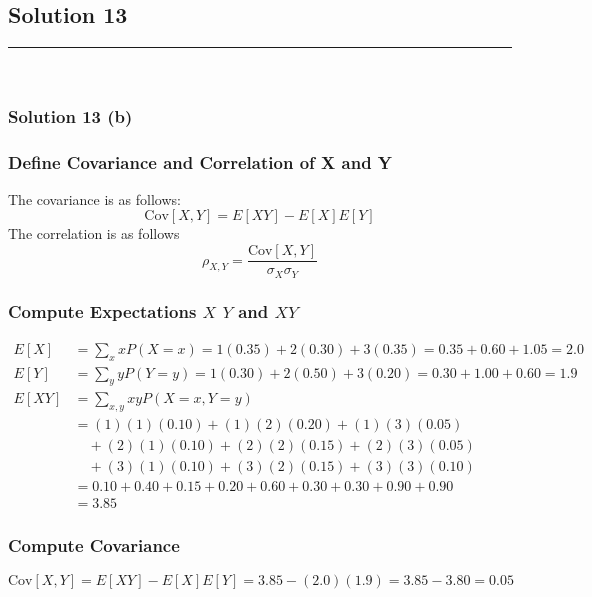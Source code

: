 \documentclass{article}
\begin{document}
\subsection*{Solution 13}
\noindent\rule{\textwidth}{0.4pt}\\
\subsubsection*{Solution  13 (b)}

\subsubsection*{Define Covariance and Correlation of X and Y}
\parbox{\textwidth}{
The covariance is as follows:
$$\text{Cov}[X, Y] = E[XY] - E[X]E[Y]$$
The correlation is as follows
$$\rho_{X, Y} = \frac{\text{Cov}[X, Y]}{\sigma_X \sigma_Y}$$
}

\subsubsection*{Compute Expectations $X$ $Y$ and $XY$}

\begin{align*}
  E[X] &= \sum_{x} x P(X=x) = 1(0.35) + 2(0.30) + 3(0.35) = 0.35 + 0.60 + 1.05 = 2.0 \\
  E[Y] &= \sum_{y} y P(Y=y) = 1(0.30) + 2(0.50) + 3(0.20) = 0.30 + 1.00 + 0.60 = 1.9 \\
    E[XY] &= \sum_{x,y} xy P(X=x, Y=y) \\
          &= (1)(1)(0.10) + (1)(2)(0.20) + (1)(3)(0.05) \\
          &\quad + (2)(1)(0.10) + (2)(2)(0.15) + (2)(3)(0.05) \\
          &\quad + (3)(1)(0.10) + (3)(2)(0.15) + (3)(3)(0.10) \\
          &= 0.10 + 0.40 + 0.15 + 0.20 + 0.60 + 0.30 + 0.30 + 0.90 + 0.90 \\
          &= 3.85
\end{align*}

\subsubsection*{Compute Covariance}
$$\text{Cov}[X, Y] = E[XY] - E[X]E[Y] = 3.85 - (2.0)(1.9) = 3.85 - 3.80 = 0.05$$
\end{document}
